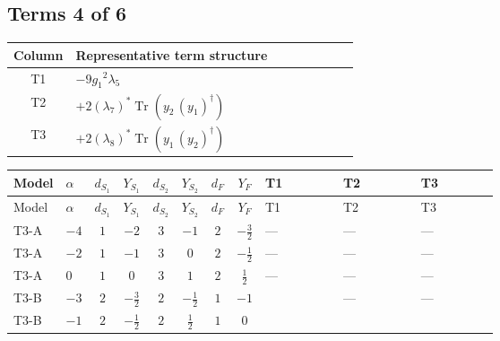 \documentclass[8pt]{article}
\begin{document}
\begin{landscape}
\subsection*{Terms 4 of 6}
\begin{center}
\begin{tabular}{@{}c >{\raggedright\arraybackslash}p{0.82\linewidth}@{}}
\toprule
Column & Representative term structure \\
\midrule
T1 & \(\displaystyle -9 {g_1}^2 {\lambda_5}\) \\
\midrule
T2 & \(\displaystyle +2 \left({\lambda_{7}}\right)^{*} \operatorname{Tr}\!\left({y_2}\,\left({y_1}\right)^{\dagger}\right)\) \\
\midrule
T3 & \(\displaystyle +2 \left({\lambda_{8}}\right)^{*} \operatorname{Tr}\!\left({y_1}\,\left({y_2}\right)^{\dagger}\right)\) \\
\midrule
\bottomrule
\end{tabular}
\end{center}
\smallskip
\tiny
\begin{longtable}{@{}llcccccc >{\raggedright\arraybackslash}p{0.21\linewidth} >{\raggedright\arraybackslash}p{0.21\linewidth} >{\raggedright\arraybackslash}p{0.21\linewidth}@{}}
\toprule
Model & $\alpha$ & $d_{S_1}$ & $Y_{S_1}$ & $d_{S_2}$ & $Y_{S_2}$ & $d_F$ & $Y_F$ & T1 & T2 & T3 \\
\midrule
\endfirsthead
\toprule
Model & $\alpha$ & $d_{S_1}$ & $Y_{S_1}$ & $d_{S_2}$ & $Y_{S_2}$ & $d_F$ & $Y_F$ & T1 & T2 & T3 \\
\midrule
\endhead
T3-A & $-4$ & $1$ & $-2$ & $3$ & $-1$ & $2$ & $-\frac{3}{2}$ & --- & --- & --- \\
\midrule
T3-A & $-2$ & $1$ & $-1$ & $3$ & $0$ & $2$ & $-\frac{1}{2}$ & --- & --- & --- \\
\midrule
T3-A & $0$ & $1$ & $0$ & $3$ & $1$ & $2$ & $\frac{1}{2}$ & --- & --- & --- \\
\midrule
T3-B & $-3$ & $2$ & $-\frac{3}{2}$ & $2$ & $-\frac{1}{2}$ & $1$ & $-1$ & \scriptsize\adjustbox{max width=\linewidth}{$\begin{gathered} -9 {g_1}^2 {\lambda_5}\end{gathered}$} & --- & --- \\
\midrule
T3-B & $-1$ & $2$ & $-\frac{1}{2}$ & $2$ & $\frac{1}{2}$ & $1$ & $0$ & \scriptsize\adjustbox{max width=\linewidth}{$\begin{gathered} -3 {g_1}^2 {\lambda_5}\end{gathered}$} & \scriptsize\adjustbox{max width=\linewidth}{$\begin{gathered} +2 \left({\lambda_{7}}\right)^{*} \operatorname{Tr}\!\left({y_2}\,\left({y_1}\right)^{\dagger}\right)\end{gathered}$} & \scriptsize\adjustbox{max width=\linewidth}{$\begin{gathered} +2 \left({\lambda_{8}}\right)^{*} \operatorname{Tr}\!\left({y_1}\,\left({y_2}\right)^{\dagger}\right)\end{gathered}$} \\

\end{longtable}
\end{landscape}
\end{document}
